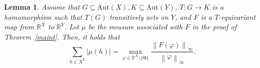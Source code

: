 \documentclass[11pt]{article}
\newcommand{\R}{\mathbb{R}}
\newtheorem{lemma}[theorem]{Lemma}
\newtheorem{proposition}[theorem]{Proposition}
\begin{document}
\begin{lemma}
    \label{lemma:ne}
    Assume that $G \subseteq \mathrm{Aut}(X), K \subseteq \mathrm{Aut}(Y)$, $T \colon G \to K$ is a homomorphism such that $T(G)$ transitively acts on $Y$, and $F$ is a $T$-equivariant map from $\mathbb{R}^X$ to $\mathbb{R}^Y$.  
    Let $\mu$ be the measure associated with $F$ in the proof of Theorem~\ref{maint}.
    Then, it holds that 
    \[
    \sum_{h \in X^Y} \lvert \mu (h) \rvert = \max_{\varphi \in \R^X \setminus \{\mathbf{0}\}}\frac{\left\| F(\varphi)\right\|_\infty}{\left\| \varphi\right\|_\infty}.
    \]
\end{lemma}
\end{document}
